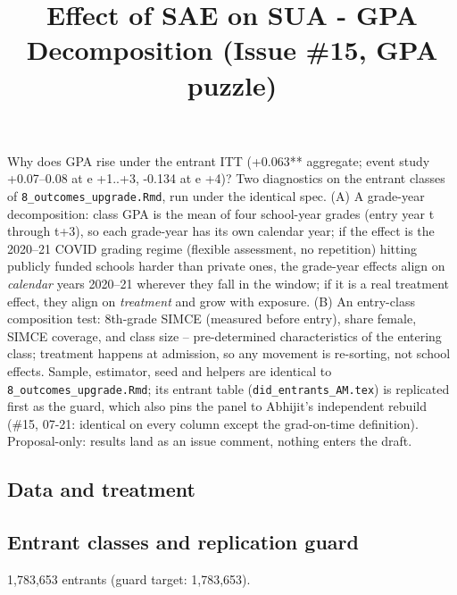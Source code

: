 \documentclass[
]{article}
\title{Effect of SAE on SUA - GPA Decomposition (Issue \#15, GPA
puzzle)}
\author{}
\date{\vspace{-2.5em}}
\begin{document}
\maketitle

Why does GPA rise under the entrant ITT (+0.063** aggregate; event study
+0.07--0.08 at e +1..+3, -0.134 at e +4)? Two diagnostics on the entrant
classes of \texttt{8\_outcomes\_upgrade.Rmd}, run under the identical
spec. (A) A grade-year decomposition: class GPA is the mean of four
school-year grades (entry year t through t+3), so each grade-year has
its own calendar year; if the effect is the 2020--21 COVID grading
regime (flexible assessment, no repetition) hitting publicly funded
schools harder than private ones, the grade-year effects align on
\emph{calendar} years 2020--21 wherever they fall in the window; if it
is a real treatment effect, they align on \emph{treatment} and grow with
exposure. (B) An entry-class composition test: 8th-grade SIMCE (measured
before entry), share female, SIMCE coverage, and class size --
pre-determined characteristics of the entering class; treatment happens
at admission, so any movement is re-sorting, not school effects. Sample,
estimator, seed and helpers are identical to
\texttt{8\_outcomes\_upgrade.Rmd}; its entrant table
(\texttt{did\_entrants\_AM.tex}) is replicated first as the guard, which
also pins the panel to Abhijit's independent rebuild (\#15, 07-21:
identical on every column except the grad-on-time definition).
Proposal-only: results land as an issue comment, nothing enters the
draft.

\hypertarget{data-and-treatment}{%
\subsection{Data and treatment}\label{data-and-treatment}}

\hypertarget{entrant-classes-and-replication-guard}{%
\subsection{Entrant classes and replication
guard}\label{entrant-classes-and-replication-guard}}

1,783,653 entrants (guard target: 1,783,653).
\end{document}
